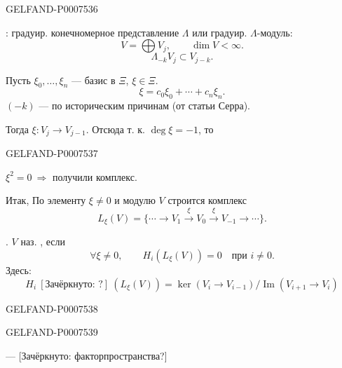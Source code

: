 \begin{GelfandAdjacentEvidence}{GELFAND-P000753}{6}


: градуир. конечномерное представление
\(\Lambda\) или градуир. \(\Lambda\)-модуль:
\begin{equation*}
V=\bigoplus V_j,\qquad \dim V<\infty.
\tag{2}
\end{equation*}
\begin{equation*}
\Lambda_{-k}V_j\subset V_{j-k}.
\tag{3}
\end{equation*}

Пусть \(\xi_0,\ldots,\xi_n\) --- базис в \(\Xi\), \(\xi\in\Xi\).
\begin{equation*}
\xi=c_0\xi_0+\cdots+c_n\xi_n.
\tag{4}
\end{equation*}
\((-k)\) --- по историческим причинам (от статьи Серра).

Тогда \(\xi:V_j\longrightarrow V_{j-1}\).
Отсюда т. к. \(\deg\xi=-1\), то
\end{GelfandAdjacentEvidence}
\begin{GelfandAdjacentEvidence}{GELFAND-P000753}{7}


\(\xi^2=0\ \Rightarrow\) получили комплекс.

Итак, По элементу \(\xi\ne0\) и модулю \(V\) строится комплекс
\begin{equation*}
L_\xi(V)=
\{\cdots\longrightarrow V_1\xrightarrow{\xi}V_0
\xrightarrow{\xi}V_{-1}\longrightarrow\cdots\}.
\tag{5}
\end{equation*}

. \(V\) наз. , если
\begin{equation*}
\forall\xi\ne0,\qquad H_i(L_\xi(V))=0\quad\text{при }i\ne0.
\tag{6}
\end{equation*}
Здесь:
\begin{equation*}
H_i\ [\text{Зачёркнуто: ?}]\ (L_\xi(V))
=\ker(V_i\longrightarrow V_{i-1})/
\operatorname{Im}(V_{i+1}\longrightarrow V_i)
\tag{7}
\end{equation*}
\end{GelfandAdjacentEvidence}
\begin{GelfandAdjacentEvidence}{GELFAND-P000753}{8}

\end{GelfandAdjacentEvidence}
\begin{GelfandAdjacentEvidence}{GELFAND-P000753}{9}


--- [Зачёркнуто: факторпространства?]
\end{GelfandAdjacentEvidence}

